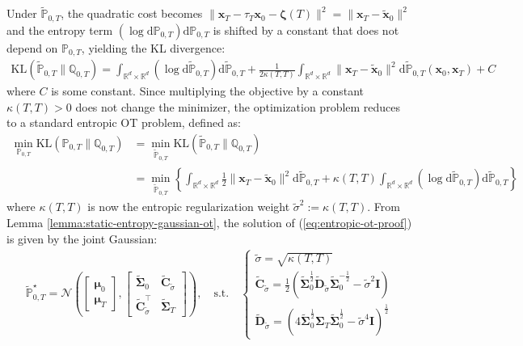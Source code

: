 \documentclass{article}
\begin{document}
Under $\tilde{\mathbb{P}}_{0,T}$, the quadratic cost becomes $\|\boldsymbol{x}_T-\tau_T\boldsymbol{x}_0-\boldsymbol{\zeta}(T)\|^2=\|\boldsymbol{x}_T-\tilde{\boldsymbol{x}}_0\|^2$ and the entropy term $(\log\mathrm{d}\mathbb{P}_{0,T}) \mathrm{d}\mathbb{P}_{0,T}$ is shifted by a constant that does not depend on $\mathbb{P}_{0,T}$, yielding the KL divergence:
\begin{align}
    \text{KL}(\tilde{\mathbb{P}}_{0,T}\|\mathbb{Q}_{0,T})=\int_{\mathbb{R}^d\times \mathbb{R}^d}(\log\mathrm{d}\tilde{\mathbb{P}}_{0,T}) \mathrm{d}\tilde{\mathbb{P}}_{0,T}+\frac{1}{2\kappa(T,T)}\int_{\mathbb{R}^d\times \mathbb{R}^d}\|\boldsymbol{x}_T-\tilde{\boldsymbol{x}}_0\|^2\mathrm{d}\tilde{\mathbb{P}}_{0,T}(\boldsymbol{x}_0, \boldsymbol{x}_T)+C
\end{align}
where $C$ is some constant. Since multiplying the objective by a constant $\kappa(T,T)> 0$ does not change the minimizer, the optimization problem reduces to a standard entropic OT problem, defined as: 
\begin{align}
    \min_{\mathbb{P}_{0,T}} \text{KL}(\mathbb{P}_{0,T}\|\mathbb{Q}_{0,T})&=\min_{\tilde{\mathbb{P}}_{0,T}} \text{KL}(\tilde{\mathbb{P}}_{0,T}\|\mathbb{Q}_{0,T})\nonumber\\
    &=\min_{\tilde{\mathbb{P}}_{0,T}}\left\{\int_{\mathbb{R}^d\times \mathbb{R}^d}\frac{1}{2}\|\boldsymbol{x}_T-\tilde{\boldsymbol{x}}_0\|^2\mathrm{d}\tilde{\mathbb{P}}_{0,T}+\kappa(T,T)\int_{\mathbb{R}^d\times \mathbb{R}^d}(\log\mathrm{d}\tilde{\mathbb{P}}_{0,T}) \mathrm{d}\tilde{\mathbb{P}}_{0,T}\right\}\label{eq:entropic-ot-proof}
\end{align}
where $\kappa(T,T)$ is now the entropic regularization weight $\tilde{\sigma}^2:=\kappa(T,T)$. From Lemma \ref{lemma:static-entropy-gaussian-ot}, the solution of (\ref{eq:entropic-ot-proof}) is given by the joint Gaussian:
\begin{align}
    \tilde{\mathbb{P}}^\star_{0,T}=\mathcal{N}\left(\begin{bmatrix}
        \boldsymbol{\mu}_0\\ \boldsymbol{\mu}_T
    \end{bmatrix}, \begin{bmatrix}
        \tilde{\boldsymbol{\Sigma}}_0 & \tilde{\boldsymbol{C}}_{\tilde{\sigma}}\\
        \tilde{\boldsymbol{C}}_{\tilde{\sigma}}^\top & \tilde{\boldsymbol{\Sigma}}_T
    \end{bmatrix}\right), \quad \text{s.t.}\quad \begin{cases}
        \tilde{\sigma}=\sqrt{\kappa(T,T)}\\
        \tilde{\boldsymbol{C}}_{\tilde{\sigma}}=\frac{1}{2}\left(\tilde{\boldsymbol{\Sigma}}_0^{\frac{1}{2}}\tilde{\boldsymbol{D}}_{\tilde{\sigma}}\tilde{\boldsymbol{\Sigma}}_0^{-\frac{1}{2}}-\tilde{\sigma}^2\boldsymbol{I}\right)\\
        \tilde{\boldsymbol{D}}_{\tilde{\sigma}}=\left(4\tilde{\boldsymbol{\Sigma}}_0^{\frac{1}{2}}\boldsymbol{\Sigma}_T\tilde{\boldsymbol{\Sigma}}_0^{\frac{1}{2}}-\tilde{\sigma}^4\boldsymbol{I}\right)^{\frac{1}{2}}
    \end{cases}
\end{align}
\end{document}
